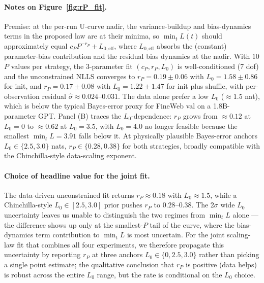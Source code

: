 \paragraph{Notes on Figure~\ref{fig:rP_fit}.}
Premise: at the per-run U-curve nadir, the variance-buildup and bias-dynamics terms in the proposed law are at their minima, so $\min_t L(t)$ should approximately equal $c_P P^{-r_P} + L_{0,\mathrm{eff}}$, where $L_{0,\mathrm{eff}}$ absorbs the (constant) parameter-bias contribution and the residual bias dynamics at the nadir.
With $10$ $P$ values per strategy, the $3$-parameter fit $(c_P, r_P, L_0)$ is well-conditioned (7 dof) and the unconstrained NLLS converges to $r_P = 0.19 \pm 0.06$ with $L_0 = 1.58 \pm 0.86$ for init, and $r_P = 0.17 \pm 0.08$ with $L_0 = 1.22 \pm 1.47$ for init plus shuffle, with per-observation residual $\hat\sigma \approx 0.024$--$0.031$.
The data alone prefer a low $L_0$ ($\approx 1.5$ nat), which is below the typical Bayes-error proxy for FineWeb val on a 1.8B-parameter GPT.
Panel (B) traces the $L_0$-dependence: $r_P$ grows from $\approx 0.12$ at $L_0 = 0$ to $\approx 0.62$ at $L_0 = 3.5$, with $L_0 = 4.0$ no longer feasible because the smallest $\min_t L = 3.91$ falls below it.
At physically plausible Bayes-error anchors $L_0 \in \{2.5, 3.0\}$ nats, $r_P \in \{0.28, 0.38\}$ for both strategies, broadly compatible with the Chinchilla-style data-scaling exponent.

\paragraph{Choice of headline value for the joint fit.}
The data-driven unconstrained fit returns $r_P \approx 0.18$ with $L_0 \approx 1.5$, while a Chinchilla-style $L_0 \in [2.5, 3.0]$ prior pushes $r_P$ to $0.28$--$0.38$.
The 2$\sigma$ wide $L_0$ uncertainty leaves us unable to distinguish the two regimes from $\min_t L$ alone --- the difference shows up only at the smallest-$P$ tail of the curve, where the bias-dynamics term contribution to $\min_t L$ is most uncertain.
For the joint scaling-law fit that combines all four experiments, we therefore propagate this uncertainty by reporting $r_P$ at three anchors $L_0 \in \{0, 2.5, 3.0\}$ rather than picking a single point estimate; the qualitative conclusion that $r_P$ is positive (data helps) is robust across the entire $L_0$ range, but the rate is conditional on the $L_0$ choice.

